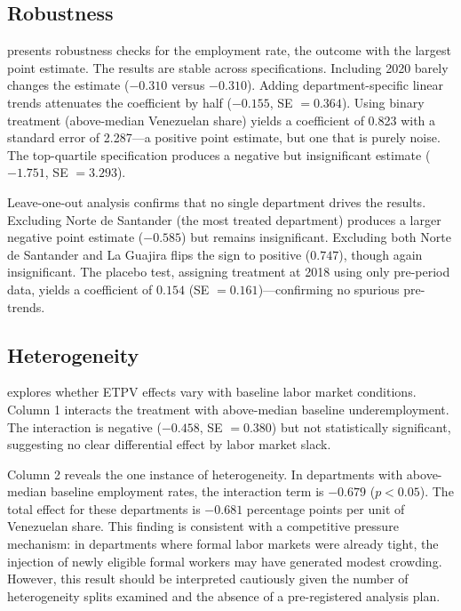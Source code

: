\documentclass[12pt]{article}
\begin{document}
\subsection{Robustness}

 presents robustness checks for the employment rate, the outcome with the largest point estimate. The results are stable across specifications. Including 2020 barely changes the estimate ($-0.310$ versus $-0.310$). Adding department-specific linear trends attenuates the coefficient by half ($-0.155$, SE $= 0.364$). Using binary treatment (above-median Venezuelan share) yields a coefficient of 0.823 with a standard error of 2.287---a positive point estimate, but one that is purely noise. The top-quartile specification produces a negative but insignificant estimate ($-1.751$, SE $= 3.293$).



Leave-one-out analysis confirms that no single department drives the results. Excluding Norte de Santander (the most treated department) produces a larger negative point estimate ($-0.585$) but remains insignificant. Excluding both Norte de Santander and La Guajira flips the sign to positive ($0.747$), though again insignificant. The placebo test, assigning treatment at 2018 using only pre-period data, yields a coefficient of $0.154$ (SE $= 0.161$)---confirming no spurious pre-trends.

\subsection{Heterogeneity}

 explores whether ETPV effects vary with baseline labor market conditions. Column 1 interacts the treatment with above-median baseline underemployment. The interaction is negative ($-0.458$, SE $= 0.380$) but not statistically significant, suggesting no clear differential effect by labor market slack.



Column 2 reveals the one instance of heterogeneity. In departments with above-median baseline employment rates, the interaction term is $-0.679$ ($p < 0.05$). The total effect for these departments is $-0.681$ percentage points per unit of Venezuelan share. This finding is consistent with a competitive pressure mechanism: in departments where formal labor markets were already tight, the injection of newly eligible formal workers may have generated modest crowding. However, this result should be interpreted cautiously given the number of heterogeneity splits examined and the absence of a pre-registered analysis plan.
\end{document}
